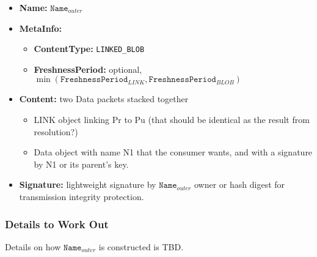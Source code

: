 \documentclass[10pt]{article}
\begin{document}
\begin{itemize}
\item \textbf{Name:} $\mathtt{Name}_{outer}$
\item \textbf{MetaInfo:}
  \begin{itemize}
  \item \textbf{ContentType:} \verb|LINKED_BLOB|
  \item \textbf{FreshnessPeriod:} optional, $\min(\mathtt{FreshnessPeriod}_{LINK}, \mathtt{FreshnessPeriod}_{BLOB})$
  \end{itemize}
\item \textbf{Content:} two Data packets stacked together
  \begin{itemize}
  \item LINK object linking Pr to Pu (that should be identical as the result from resolution?)
  \item Data object with name N1 that the consumer wants, and with a signature by N1 or its parent's key.
  \end{itemize}

\item \textbf{Signature:} lightweight signature by $\mathtt{Name}_{outer}$ owner or hash digest for transmission integrity protection.

\end{itemize}

\subsubsection{Details to Work Out}


Details on how $\mathtt{Name}_{outer}$ is constructed is TBD.

% 
% 
\end{document}

